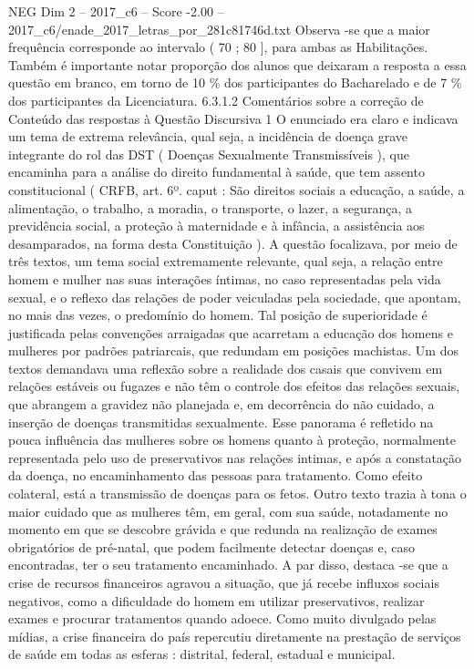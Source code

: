 \begin{textsample}{NEG Dim 2 – 2017\_c6 – Score -2.00 – 2017\_c6/enade\_2017\_letras\_por\_281c81746d.txt}
Observa -se que a maior frequência corresponde ao intervalo ( 70 ; 80 ], para ambas as Habilitações.
Também é importante notar proporção dos alunos que deixaram a resposta a essa questão em branco, em torno de 10 \% dos participantes do Bacharelado e de 7 \% dos participantes da Licenciatura. 6.3.1.2 Comentários sobre a correção de Conteúdo das respostas à Questão Discursiva 1 O enunciado era claro e indicava um tema de extrema relevância, qual seja, a incidência de doença grave integrante do rol das DST ( Doenças Sexualmente Transmissíveis ), que encaminha para a análise do direito fundamental à saúde, que tem assento constitucional ( CRFB, art. 6º. caput : São direitos sociais a educação, a saúde, a alimentação, o trabalho, a moradia, o transporte, o lazer, a segurança, a previdência social, a proteção à maternidade e à infância, a assistência aos desamparados, na forma desta Constituição ).
A questão focalizava, por meio de três textos, um tema social extremamente relevante, qual seja, a relação entre homem e mulher nas suas interações íntimas, no caso representadas pela vida sexual, e o reflexo das relações de poder veiculadas pela sociedade, que apontam, no mais das vezes, o predomínio do homem.
Tal posição de superioridade é justificada pelas convenções arraigadas que acarretam a educação dos homens e mulheres por padrões patriarcais, que redundam em posições machistas.
Um dos textos demandava uma reflexão sobre a realidade dos casais que convivem em relações estáveis ou fugazes e não têm o controle dos efeitos das relações sexuais, que abrangem a gravidez não planejada e, em decorrência do não cuidado, a inserção de doenças transmitidas sexualmente.
Esse panorama é refletido na pouca influência das mulheres sobre os homens quanto à proteção, normalmente representada pelo uso de preservativos nas relações intimas, e após a constatação da doença, no encaminhamento das pessoas para tratamento.
Como efeito colateral, está a transmissão de doenças para os fetos.
Outro texto trazia à tona o maior cuidado que as mulheres têm, em geral, com sua saúde, notadamente no momento em que se descobre grávida e que redunda na realização de exames obrigatórios de pré-natal, que podem facilmente detectar doenças e, caso encontradas, ter o seu tratamento encaminhado.
A par disso, destaca -se que a crise de recursos financeiros agravou a situação, que já recebe influxos sociais negativos, como a dificuldade do homem em utilizar preservativos, realizar exames e procurar tratamentos quando adoece.
Como muito divulgado pelas mídias, a crise financeira do país repercutiu diretamente na prestação de serviços de saúde em todas as esferas : distrital, federal, estadual e municipal.

\end{textsample}

